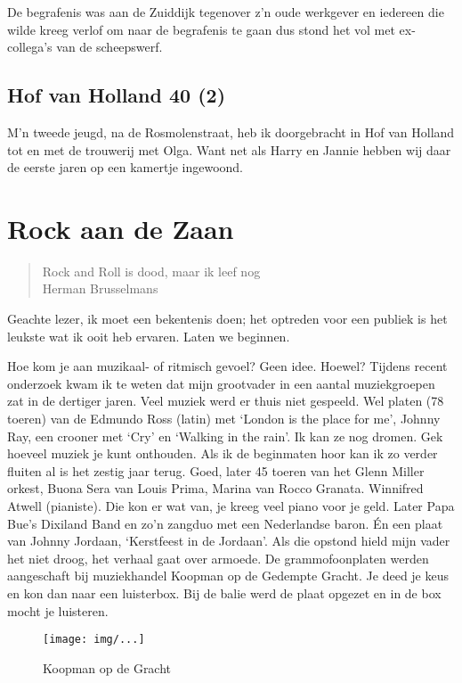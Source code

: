 \documentclass[10pt,twoside,openright]{memoir}
\begin{document}
De begrafenis was aan de Zuiddijk tegenover z’n oude werkgever en iedereen die wilde kreeg verlof om naar de begrafenis te gaan dus stond het vol met ex-collega’s van de scheepswerf. 

\chapter{Hof van Holland 40 (2)} %
\label{cha:hofvanholland2}

M’n tweede jeugd, na de Rosmolenstraat, heb ik doorgebracht in Hof van Holland tot en met de trouwerij met Olga. Want net als Harry en Jannie hebben wij daar de eerste jaren op een kamertje ingewoond.

\part{Rock aan de Zaan}

\begin{quote}
Rock and Roll is dood, maar ik leef nog \\
Herman Brusselmans
\end{quote}

Geachte lezer, ik moet een bekentenis doen; het optreden voor een publiek is het leukste wat ik ooit heb ervaren. Laten we beginnen.

Hoe kom je aan muzikaal- of ritmisch gevoel? Geen idee. Hoewel? Tijdens recent onderzoek kwam ik te weten dat mijn grootvader in een aantal muziekgroepen zat in de dertiger jaren. Veel muziek werd er thuis niet gespeeld. Wel platen (78 toeren) van de Edmundo Ross (latin) met ‘London is the place for me’, Johnny Ray, een crooner met ‘Cry’ en ‘Walking in the rain’. Ik kan ze nog dromen. Gek hoeveel muziek je kunt onthouden. Als ik de beginmaten hoor kan ik zo verder fluiten al is het zestig jaar terug. Goed, later 45 toeren van het Glenn Miller orkest, Buona Sera van Louis Prima, Marina van Rocco Granata. Winnifred Atwell (pianiste). Die kon er wat van, je kreeg veel piano voor je geld. Later Papa Bue’s Dixiland Band en zo’n zangduo met een Nederlandse baron. Én een plaat van Johnny Jordaan, ‘Kerstfeest in de Jordaan’. Als die opstond hield mijn vader het niet droog, het verhaal gaat over armoede. De grammofoonplaten werden aangeschaft bij muziekhandel Koopman op de Gedempte Gracht. Je deed je keus en kon dan naar een luisterbox. Bij de balie werd de plaat opgezet en in de box mocht je luisteren. 

\begin{figure}[t]
\texttt{[image: img/...]}
\caption{Koopman op de Gracht}
\end{figure}
\end{document}
